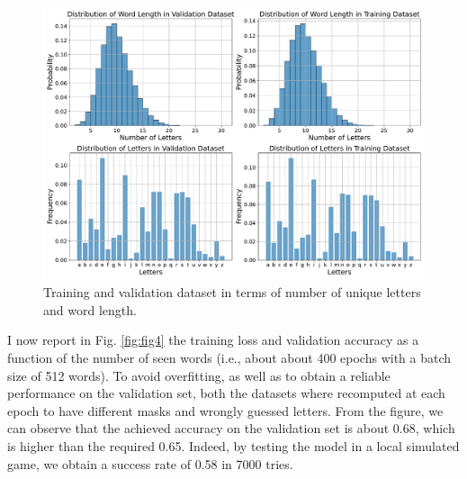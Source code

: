 \documentclass{report}
\begin{document}
\begin{figure}[!h]
    \centering
    \includegraphics[width=1\textwidth]{figures/Figure_3.pdf}
    \caption{Training and validation dataset in terms of number of unique letters and word length.}
    \label{fig:fig3}    
\end{figure}

I now report in Fig. \ref{fig:fig4} the training loss and validation accuracy as a function 
of the number of seen words (i.e., about about 400 epochs with a batch size of 512 words). 
To avoid overfitting, as well as to obtain a reliable performance on the validation set, both the datasets where 
recomputed at each epoch to have different masks and wrongly guessed letters.
From the figure, we can observe that the achieved accuracy on the validation set is about 0.68, 
which is higher than the required 0.65. 
Indeed, by testing the model in a local simulated game, we obtain a success rate of 0.58 in 7000 tries.
\end{document}
